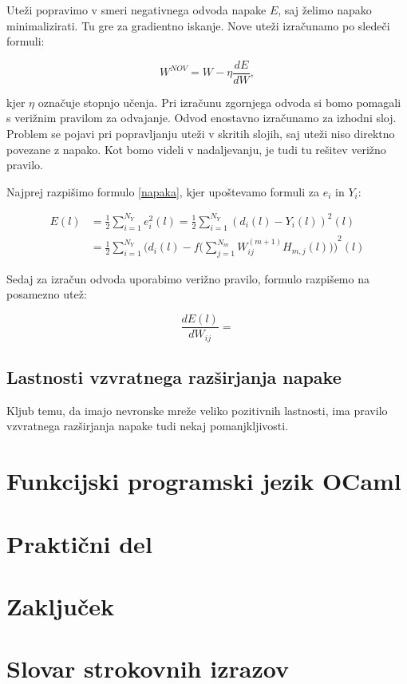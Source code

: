 \documentclass[mat1]{fmfdelo}
\begin{document}
Uteži popravimo v smeri negativnega odvoda napake $E$, saj želimo napako minimalizirati. Tu gre za gradientno iskanje. Nove uteži izračunamo po sledeči formuli:

\begin{equation}
W^{NOV} = W - \eta \frac{dE}{dW}, 
\end{equation}

kjer $\eta$ označuje stopnjo učenja. 
Pri izračunu zgornjega odvoda si bomo pomagali s verižnim pravilom za odvajanje. Odvod enostavno izračunamo za izhodni sloj. Problem se pojavi pri popravljanju uteži v skritih slojih, saj uteži niso direktno povezane z napako. Kot bomo videli v nadaljevanju, je tudi tu rešitev verižno pravilo.

Najprej razpišimo formulo \eqref{napaka}, kjer upoštevamo formuli za $e_i$ in $Y_i$:

\[ 
\begin{aligned}
E(l) &= \frac{1}{2}\sum^{N_Y}_{i=1}e_i^2(l) =   \frac{1}{2}\sum^{N_Y}_{i=1}{(d_i(l) - Y_i(l))}^2(l) \\
&= \frac{1}{2}\sum^{N_Y}_{i=1}{(d_i(l)-f(\sum^{N_m}_{j=1}{W^{(m+1)}_{ij}H_{m,j}(l)))}}^2(l)  
\end{aligned}
\]

 Sedaj za izračun odvoda uporabimo verižno pravilo,  formulo razpišemo na posamezno utež:

\begin{equation}
 \frac{dE(l)}{dW_{ij}} = 
\end{equation}


\subsection{Lastnosti vzvratnega razširjanja napake}
Kljub temu, da imajo nevronske mreže veliko pozitivnih lastnosti, ima pravilo vzvratnega razširjanja napake tudi nekaj pomanjkljivosti.



\section{Funkcijski programski jezik OCaml}

\section{Praktični del}

\section{Zaključek}

\section*{Slovar strokovnih izrazov}

\geslo{}{}
\geslo{}{}

\begin{thebibliography}{99}



\end{thebibliography}
\end{document}
